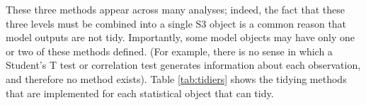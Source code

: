 These three methods appear across many analyses; indeed, the fact that these three levels must be combined into a single S3 object is a common reason that model outputs are not tidy. Importantly, some model objects may have only one or two of these methods defined. (For example, there is no sense in which a Student's T test or correlation test generates information about each observation, and therefore no  method exists). Table \ref{tab:tidiers} shows the tidying methods that are implemented for each statistical object that  can tidy.

% 
% 
% 
% 
% 
